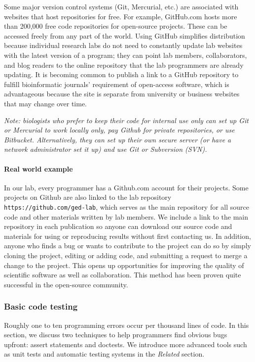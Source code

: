 \documentclass[ChapterTOCs,krantz2]{krantz} %
\begin{document}
Some major version control systems (Git, Mercurial, etc.) are associated with websites 
that host repositories for free.  For example, GitHub.com hosts more than 200,000 free code
repositories for open-source projects. These can be accessed
freely from any part of the world.  Using GitHub
simplifies distribution because individual research labs do not need to
constantly update lab websites with the latest version of a program;
they can point lab members, collaborators, and blog readers to the online
repository that the lab programmers are already updating.  It is becoming 
common to publish a link to a GitHub repository to
fulfill bioinformatic journals' requirement of open-access software, 
which is advantageous because the site is separate from
university or business websites that may change over time.  

\textsl{Note: biologists who prefer to keep their
code for internal use only can set up Git or Mercurial to work 
locally only, pay Github for private repositories, or use Bitbucket.  
Alternatively, they can set up their own secure
server (or have a network administrator set it up) and use
Git or Subversion (SVN).}

\paragraph{Real world example}

In our lab, every programmer has a Github.com account for their projects.
Some
projects on Github are also linked to the lab repository
\texttt{https://github.com/ged-lab}, which serves as the main repository for
all source code and other materials written by lab members. 
We include a link to the main repository in each
publication so anyone can download our source code and materials
for using or reproducing results without first contacting us. 
In addition, anyone who finds a bug or wants to contribute to
the project can do so by simply cloning the project, editing or adding code,
and submitting a request to merge a change to the project.
This opens up opportunities for improving the quality of scientific software
as well as collaboration.
This method has been proven quite successful in the open-source community.

\subsubsection{Basic code testing}

Roughly one to ten programming errors occur 
per thousand lines of code\cite{Boehm2005,Ince2012}.  
In this section, we discuss two techniques to help
programmers find obvious bugs upfront: 
assert statements and doctests. We introduce more advanced
tools such as unit tests and automatic testing systems in the \emph{Related}
section.
\end{document}
